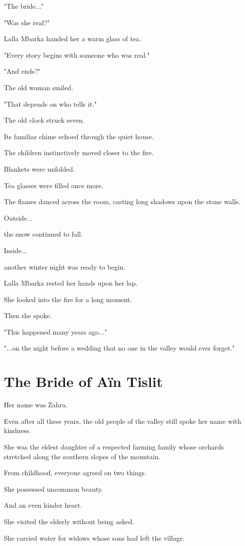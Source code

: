 \documentclass[12pt,openany]{book}
\begin{document}
"The bride..."

"Was she real?"

Lalla Mbarka handed her a warm glass of tea.

"Every story begins with someone who was real."

"And ends?"

The old woman smiled.

"That depends on who tells it."

The old clock struck seven.

Its familiar chime echoed through the quiet house.

The children instinctively moved closer to the fire.

Blankets were unfolded.

Tea glasses were filled once more.

The flames danced across the room, casting long shadows upon the stone walls.

Outside...

the snow continued to fall.

Inside...

another winter night was ready to begin.

Lalla Mbarka rested her hands upon her lap.

She looked into the fire for a long moment.

Then she spoke.

"This happened many years ago..."

"...on the night before a wedding that no one in the valley would ever forget."
\section*{The Bride of Aïn Tislit}

Her name was Zahra.

Even after all these years, the old people of the valley still spoke her name with kindness.

She was the eldest daughter of a respected farming family whose orchards stretched along the southern slopes of the mountain.

From childhood, everyone agreed on two things.

She possessed uncommon beauty.

And an even kinder heart.

She visited the elderly without being asked.

She carried water for widows whose sons had left the village.
\end{document}
